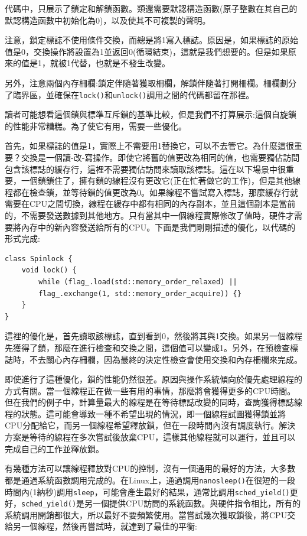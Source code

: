 代碼中，只展示了鎖定和解鎖函數。類還需要默認構造函數(原子整數在其自己的默認構造函數中初始化為0)，以及使其不可複製的聲明。

注意，鎖定標誌不使用條件交換，而總是將1寫入標誌。原因是，如果標誌的原始值是0，交換操作將設置為1並返回0(循環結束)，這就是我們想要的。但是如果原來的值是1，就被1代替，也就是不發生改變。

另外，注意兩個內存柵欄:鎖定伴隨著獲取柵欄，解鎖伴隨著打開柵欄。柵欄劃分了臨界區，並確保在\texttt{lock()}和\texttt{unlock()}調用之間的代碼都留在那裡。

讀者可能想看這個鎖與標準互斥鎖的基準比較，但是我們不打算展示:這個自旋鎖的性能非常糟糕。為了使它有用，需要一些優化。

首先，如果標誌的值是1，實際上不需要用1替換它，可以不去管它。為什麼這很重要？交換是一個讀-改-寫操作。即使它將舊的值更改為相同的值，也需要獨佔訪問包含該標誌的緩存行，這裡不需要獨佔訪問來讀取該標誌。這在以下場景中很重要，一個鎖鎖住了，擁有鎖的線程沒有更改它(正在忙著做它的工作)，但是其他線程都在檢查鎖，並等待鎖的值更改為0。如果線程不嘗試寫入標誌，那麼緩存行就需要在CPU之間切換，線程在緩存中都有相同的內存副本，並且這個副本是當前的，不需要發送數據到其他地方。只有當其中一個線程實際修改了值時，硬件才需要將內存中的新內容發送給所有的CPU。下面是我們剛剛描述的優化，以代碼的形式完成:

\begin{lstlisting}[style=styleCXX]
class Spinlock {
	void lock() {
		while (flag_.load(std::memory_order_relaxed) ||
		flag_.exchange(1, std::memory_order_acquire)) {}
	}
}
\end{lstlisting}

這裡的優化是，首先讀取該標誌，直到看到0，然後將其與1交換。如果另一個線程先獲得了鎖，那麼在進行檢查和交換之間，這個值可以變成1。另外，在預檢查標誌時，不去關心內存柵欄，因為最終的決定性檢查會使用交換和內存柵欄來完成。

即使進行了這種優化，鎖的性能仍然很差。原因與操作系統傾向於優先處理線程的方式有關。當一個線程正在做一些有用的事情，那麼將會獲得更多的CPU時間。但在我們的例子中，計算量最大的線程是在等待標誌改變的同時，查詢獲得標誌線程的狀態。這可能會導致一種不希望出現的情況，即一個線程試圖獲得鎖並將CPU分配給它，而另一個線程希望釋放鎖，但在一段時間內沒有調度執行。解決方案是等待的線程在多次嘗試後放棄CPU，這樣其他線程就可以運行，並且可以完成自己的工作並釋放鎖。

有幾種方法可以讓線程釋放對CPU的控制，沒有一個通用的最好的方法，大多數都是通過系統函數調用完成的。在Linux上，通過調用\texttt{nanosleep()}在很短的一段時間內(1納秒)調用\texttt{sleep}，可能會產生最好的結果，通常比調用\texttt{sched\_yield()}更好，\texttt{sched\_yield()}是另一個提供CPU訪問的系統函數。與硬件指令相比，所有的系統調用開銷都很大，所以最好不要頻繁使用。當嘗試幾次獲取鎖後，將CPU交給另一個線程，然後再嘗試時，就達到了最佳的平衡:

